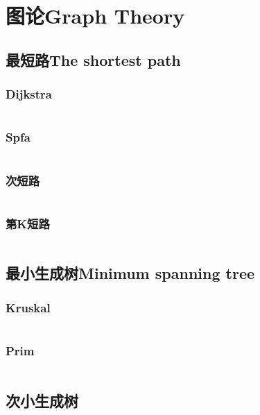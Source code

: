 \documentclass[twoside,sub3section,UTF8]{ctexart}						%
\begin{document}
\newpage
\section{图论Graph Theory}
	\subsection{最短路The shortest path}
		\subsubsection{Dijkstra}
			\inputminted{c++}{"Gragh Theory/The shortest path/dijkstra.cpp"}
		\subsubsection{Spfa}
			\inputminted{c++}{"Gragh Theory/The shortest path/spfa.cpp"}
		\subsubsection{次短路}
			\inputminted{c++}{"Gragh Theory/The shortest path/secdij.cpp"}
		\subsubsection{第K短路}
			\inputminted{c++}{"Gragh Theory/The shortest path/Astar.cpp"}

		\subsection{最小生成树Minimum spanning tree}
			\subsubsection{Kruskal}
				\inputminted{c++}{"Gragh Theory/MST/kruskal.cpp"}
			\subsubsection{Prim}
				\inputminted{c++}{"Gragh Theory/MST/prim.cpp"}
		\subsection{次小生成树}
			\inputminted{c++}{"Gragh Theory/MST/secmst.cpp"}
\end{document}
